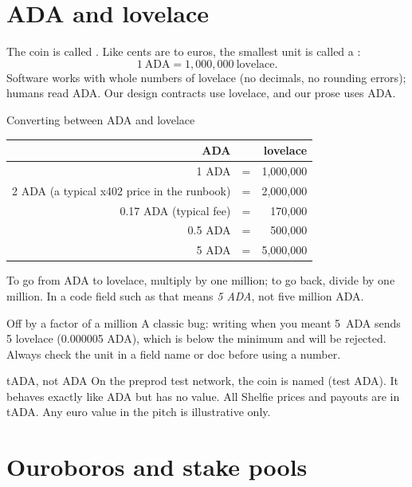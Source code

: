 \section{ADA and lovelace}

The coin is called . Like cents are to euros, the smallest unit is called a :
\[
1\ \text{ADA} = 1{,}000{,}000\ \text{lovelace}.
\]
Software works with whole numbers of lovelace (no decimals, no rounding errors); humans read ADA. Our design contracts use lovelace, and our prose uses ADA.

\begin{examplebox}{Converting between ADA and lovelace}
\begin{center}
\small
\begin{tabular}{rcr}
\toprule
\textbf{ADA} & & \textbf{lovelace}\\
\midrule
1 ADA & = & 1{,}000{,}000\\
2 ADA (a typical x402 price in the runbook) & = & 2{,}000{,}000\\
0.17 ADA (typical fee) & = & 170{,}000\\
0.5 ADA & = & 500{,}000\\
5 ADA & = & 5{,}000{,}000\\
\bottomrule
\end{tabular}
\end{center}
To go from ADA to lovelace, multiply by one million; to go back, divide by one million. In a code field such as  that means \emph{5 ADA}, not five million ADA.
\end{examplebox}

\begin{warningbox}{Off by a factor of a million}
A classic bug: writing  when you meant 5~ADA sends 5 lovelace (0.000005 ADA), which is below the minimum and will be rejected. Always check the unit in a field name or doc before using a number.
\end{warningbox}

\begin{shelfiebox}{tADA, not ADA}
On the preprod test network, the coin is named  (test ADA). It behaves exactly like ADA but has no value. All Shelfie prices and payouts are in tADA. Any euro value in the pitch is illustrative only.
\end{shelfiebox}

\section{Ouroboros and stake pools}

